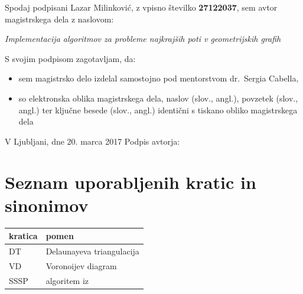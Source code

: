\documentclass[a4paper, 12pt]{book}
\newcommand{\clearemptydoublepage}{\newpage{\pagestyle{empty}\cleardoublepage}}
\begin{document}
\vspace{1cm}
\noindent Spodaj podpisani Lazar Milinković,
z vpisno številko \textbf{27122037}, sem avtor magistrskega dela z naslovom:
   
\vspace{0.5cm}
\emph{Implementacija algoritmov za probleme najkrajših poti v geometrijskih grafih}

\vspace{1.5cm}
\noindent S svojim podpisom zagotavljam, da:
\begin{itemize}
	\item sem magistrsko delo izdelal samostojno pod mentorstvom 
		dr.\ Sergia Cabella,

	\item	so elektronska oblika magistrskega dela, naslov (slov., angl.), povzetek (slov., angl.) ter ključne besede (slov., angl.) identični s tiskano obliko magistrskega dela
\end{itemize}

\vspace{1cm}
\noindent V Ljubljani, dne 20. marca 2017 \hfill Podpis avtorja:

\clearemptydoublepage

\thispagestyle{empty}\mbox{}\vfill\null\it%
 
\rm\normalfont

\clearemptydoublepage


\def\thepage{}%
\tableofcontents{}


\clearemptydoublepage

\chapter*{Seznam uporabljenih kratic in sinonimov}
\begin{table}[H]
\begin{tabular*}{\textwidth}{l|l}
\textbf{kratica} & \textbf{pomen} \\
\hline
DT & Delaunayeva triangulacija \\
VD & Voronoijev diagram \\
SSSP & algoritem iz ~\cite{CJ15}
\end{tabular*}
\end{table}
\end{document}
